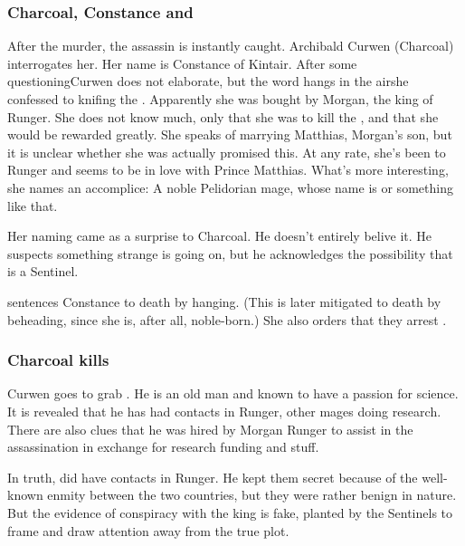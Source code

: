 \subsubsection{Charcoal, Constance and \Onatol}
After the murder, the assassin is instantly caught. 
Archibald Curwen (Charcoal) interrogates her. 
Her name is Constance of Kintair. 
After some questioning\dash Curwen does not elaborate, but the word  hangs in the air\dash she confessed to knifing the \rayuth. 
Apparently she was bought by Morgan, the king of Runger. 
She does not know much, only that she was to kill the \rayuth, and that she would be rewarded greatly. 
She speaks of marrying Matthias, Morgan's son, but it is unclear whether she was actually promised this. 
At any rate, she's been to Runger and seems to be in love with Prince Matthias. 
What's more interesting, she names an accomplice: 
A noble Pelidorian mage, whose name is \Ambrose{} \Anatoli{} or something like that. 

Her naming \Anatoli{} came as a surprise to Charcoal. 
He doesn't entirely belive it. 
He suspects something strange is going on, but he acknowledges the possibility that \Anatoli{} is a Sentinel. 

\Tiroco{} sentences Constance to death by hanging. 
(This is later mitigated to death by beheading, since she is, after all, noble-born.) 
She also orders that they arrest \Anatoli{}. 





\subsubsection{Charcoal kills \Onatol}
Curwen goes to grab \Anatoli{}. He is an old man and known to have a passion for science. 
It is revealed that he has had contacts in Runger, other mages doing research. 
There are also clues that he was hired by Morgan Runger to assist in the assassination in exchange for research funding and stuff. 

In truth, \Anatoli{} did have contacts in Runger. He kept them secret because of the well-known enmity between the two countries, but they were rather benign in nature. But the evidence of conspiracy with the king is fake, planted by the Sentinels to frame \Anatoli{} and draw attention away from the true plot. 


